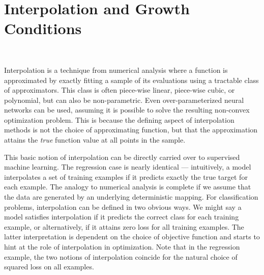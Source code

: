 
\chapter{Interpolation and Growth Conditions}~\label{ch:interpolation-gc}

Interpolation is a technique from numerical analysis where a function is approximated by exactly fitting a sample of its evaluations using a tractable class of approximators. 
This class is often piece-wise linear, piece-wise cubic, or polynomial, but can also be non-parametric. 
Even over-parameterized neural networks can be used, assuming it is possible to solve the resulting non-convex optimization problem. 
This is because the defining aspect of interpolation methods is not the choice of approximating function, but that the approximation attains the \emph{true} function value at all points in the sample.


This basic notion of interpolation can be directly carried over to supervised machine learning.  
The regression case is nearly identical --- intuitively, a model interpolates a set of training examples if it predicts exactly the true target for each example. 
The analogy to numerical analysis is complete if we assume that the data are generated by an underlying deterministic mapping.
For classification problems, interpolation can be defined in two obvious ways. 
We might say a model satisfies interpolation if it predicts the correct class for each training example, or alternatively, if it attains zero loss for all training examples.  
The latter interpretation is dependent on the choice of objective function and starts to hint at the role of interpolation in optimization.
Note that in the regression example, the two notions of interpolation coincide for the natural choice of squared loss on all examples.


